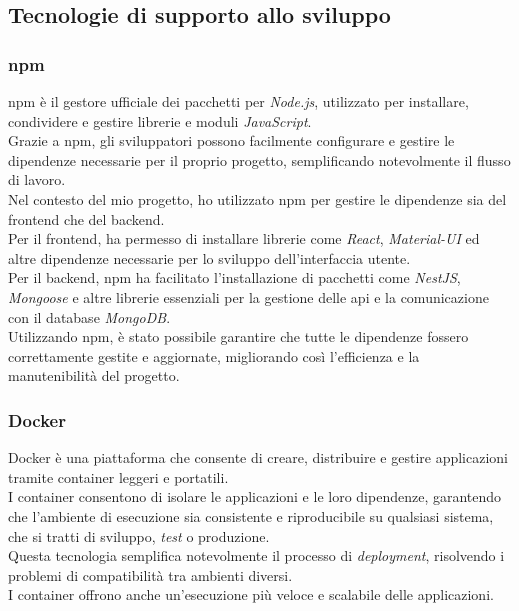 \pagebreak
\subsection{Tecnologie di supporto allo sviluppo}
\label{sez:tecnologie-supporto-sviluppo}


\subsubsection{\gls{npm}}

\gls{npm} è il gestore ufficiale dei pacchetti per \textit{Node.js}, utilizzato per installare, condividere e gestire librerie e moduli \textit{JavaScript}.\\
Grazie a \gls{npm}, gli sviluppatori possono facilmente configurare e gestire le dipendenze necessarie per il proprio progetto, semplificando notevolmente il flusso di lavoro.\\

\noindent Nel contesto del mio progetto, ho utilizzato \gls{npm} per gestire le dipendenze sia del \gls{frontend} che del \gls{backend}.\\
Per il \gls{frontend}, ha permesso di installare librerie come \textit{React}, \textit{Material-UI} ed altre dipendenze necessarie per lo sviluppo dell'interfaccia utente. \\
Per il \gls{backend}, \gls{npm} ha facilitato l'installazione di pacchetti come \textit{NestJS}, \textit{Mongoose} e altre librerie essenziali per la gestione delle \gls{api} e la comunicazione con il database \textit{MongoDB}. \\

\noindent Utilizzando \gls{npm}, è stato possibile garantire che tutte le dipendenze fossero correttamente gestite e aggiornate, migliorando così l'efficienza e la manutenibilità del progetto.

\subsubsection{Docker}

\noindent Docker è una piattaforma che consente di creare, distribuire e gestire applicazioni tramite \gls{container} leggeri e portatili.\\

\noindent I \gls{container} consentono di isolare le applicazioni e le loro dipendenze, garantendo che l'ambiente di esecuzione sia consistente e riproducibile su qualsiasi sistema, che si tratti di sviluppo, \textit{test} o produzione.\\
Questa tecnologia semplifica notevolmente il processo di \textit{deployment}, risolvendo i problemi di compatibilità tra ambienti diversi. \\
I \gls{container} offrono anche un'esecuzione più veloce e scalabile delle applicazioni.\\

